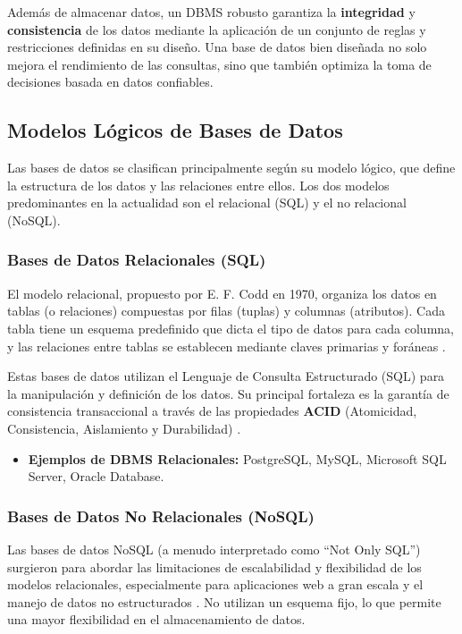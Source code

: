 Además de almacenar datos, un DBMS robusto garantiza la \textbf{integridad} y \textbf{consistencia} de los datos mediante la aplicación de un conjunto de reglas y restricciones definidas en su diseño. Una base de datos bien diseñada no solo mejora el rendimiento de las consultas, sino que también optimiza la toma de decisiones basada en datos confiables.

\subsection{Modelos Lógicos de Bases de Datos}
\label{subsec:modelos_logicos_db}

Las bases de datos se clasifican principalmente según su modelo lógico, que define la estructura de los datos y las relaciones entre ellos. Los dos modelos predominantes en la actualidad son el relacional (SQL) y el no relacional (NoSQL).

\subsubsection{Bases de Datos Relacionales (SQL)}
El modelo relacional, propuesto por E. F. Codd en 1970, organiza los datos en tablas (o relaciones) compuestas por filas (tuplas) y columnas (atributos). Cada tabla tiene un esquema predefinido que dicta el tipo de datos para cada columna, y las relaciones entre tablas se establecen mediante claves primarias y foráneas \cite{oracle2024sql}.

Estas bases de datos utilizan el Lenguaje de Consulta Estructurado (SQL) para la manipulación y definición de los datos. Su principal fortaleza es la garantía de consistencia transaccional a través de las propiedades \textbf{ACID} (Atomicidad, Consistencia, Aislamiento y Durabilidad) \cite{oracle2024acid}.
\begin{itemize}
    \item \textbf{Ejemplos de DBMS Relacionales:} PostgreSQL, MySQL, Microsoft SQL Server, Oracle Database.
\end{itemize}

\subsubsection{Bases de Datos No Relacionales (NoSQL)}
Las bases de datos NoSQL (a menudo interpretado como ``Not Only SQL'') surgieron para abordar las limitaciones de escalabilidad y flexibilidad de los modelos relacionales, especialmente para aplicaciones web a gran escala y el manejo de datos no estructurados \cite{aws2024nosql}. No utilizan un esquema fijo, lo que permite una mayor flexibilidad en el almacenamiento de datos.

